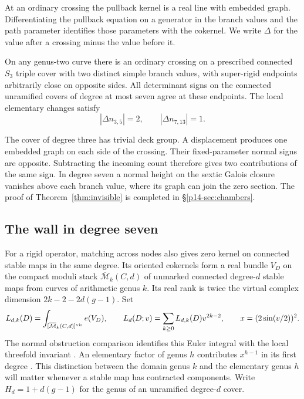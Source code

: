 At an ordinary crossing the pullback kernel is a real line with
embedded graph. Differentiating the pullback equation on a generator
in the branch values and the path parameter identifies those
parameters with the cokernel. We write \(\Delta\) for the value after
a crossing minus the value before it.

\begin{theorem}\label{thm:invisible}
On any genus-two curve there is an ordinary crossing on a prescribed connected \(S_3\) triple cover with two distinct simple branch values, with super-rigid endpoints arbitrarily close on opposite sides. All determinant signs on the connected unramified covers of degree at most seven agree at these endpoints. The local elementary changes satisfy
\[
       |\Delta n_{3,5}|=2,\qquad |\Delta n_{7,13}|=1 .
\]
\end{theorem}

The cover of degree three has trivial deck group. A displacement produces one embedded graph on each side of the
crossing. Their fixed-parameter normal signs are opposite. Subtracting
the incoming count therefore gives two contributions of the same sign. In degree seven a normal height on the
sextic Galois closure vanishes above each branch value, where its
graph can join the zero section.
The proof of Theorem~\ref{thm:invisible} is completed in
\S\ref{p14-sec:chambers}.

\subsection{The wall in degree seven}
For a rigid operator, matching across nodes also gives zero kernel
on connected stable maps in the same degree. Its oriented cokernels
form a real bundle \(V_D\) on the compact moduli stack
\(\overline{\mathcal M}_k(C,d)\) of unmarked connected degree-\(d\)
stable maps from curves of arithmetic genus \(k\). Its real rank
is twice the virtual complex dimension \(2k-2-2d(g-1)\). Set
\[
 L_{d,k}(D)=\int_{[\overline{\mathcal M}_k(C,d)]^{\rm vir}}e(V_D),
 \qquad L_d(D;v)=\sum_{k\ge0}L_{d,k}(D)v^{2k-2},
 \qquad x=(2\sin(v/2))^2.
\]
The normal obstruction comparison identifies this Euler integral with
the local threefold invariant \cite[Theorem~1.2]{zinger}. An elementary
factor of genus \(h\) contributes \(x^{h-1}\) in its first degree
\cite[Theorem~2]{pandhodge}. This distinction between the domain genus
\(k\) and the elementary genus \(h\) will matter whenever a stable map
has contracted components. Write \(H_d=1+d(g-1)\) for the genus of
an unramified degree-\(d\) cover.

